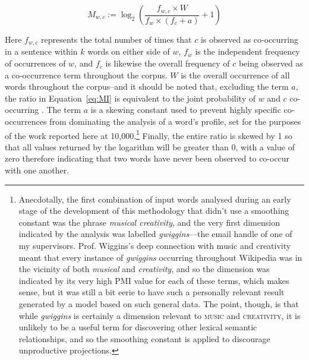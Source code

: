 \begin{equation}\label{eq:MI}
M_{w,c} := \log_2 \left(\frac{f_{w,c} \times W}{f_w \times \left(f_c + a\right)} + 1\right)
\end{equation}

\noindent Here $f_{w,c}$ represents the total number of times that $c$ is observed as co-occurring in a sentence within $k$ words on either side of $w$, $f_w$ is the independent frequency of occurrences of $w$, and $f_c$ is likewise the overall frequency of $c$ being observed as a co-occurrence term throughout the corpus.  $W$ is the overall occurrence of all words throughout the corpus--and it should be noted that, excluding the term $a$, the ratio in Equation~\ref{eq:MI} is equivalent to the joint probability of $w$ and $c$ co-occurring .  The term $a$ is a skewing constant used to prevent highly specific co-occurrences from dominating the analysis of a word's profile, set for the purposes of the work reported here at 10,000.\footnote{Anecdotally, the first combination of input words analysed during an early stage of the development of this methodology that didn't use a smoothing constant was the phrase \emph{musical creativity}, and the very first dimension indicated by the analysis was labelled \emph{gwiggins}---the email handle of one of my supervisors.  Prof. Wiggins's deep connection with music and creativity meant that every instance of \emph{gwiggins} occurring throughout Wikipedia was in the vicinity of both \emph{musical} and \emph{creativity}, and so the dimension was indicated by its very high PMI value for each of these terms, which makes sense, but it was still a bit eerie to have such a personally relevant result generated by a model based on such general data.  The point, though, is that while \emph{gwiggins} is certainly a dimension relevant to \textsc{music} and \textsc{creativity}, it is unlikely to be a useful term for discovering other lexical semantic relationships, and so the smoothing constant is applied to discourage unproductive projections.}    Finally, the entire ratio is skewed by 1 so that all values returned by the logarithm will be greater than 0, with a value of zero therefore indicating that two words have never been observed to co-occur with one another.

